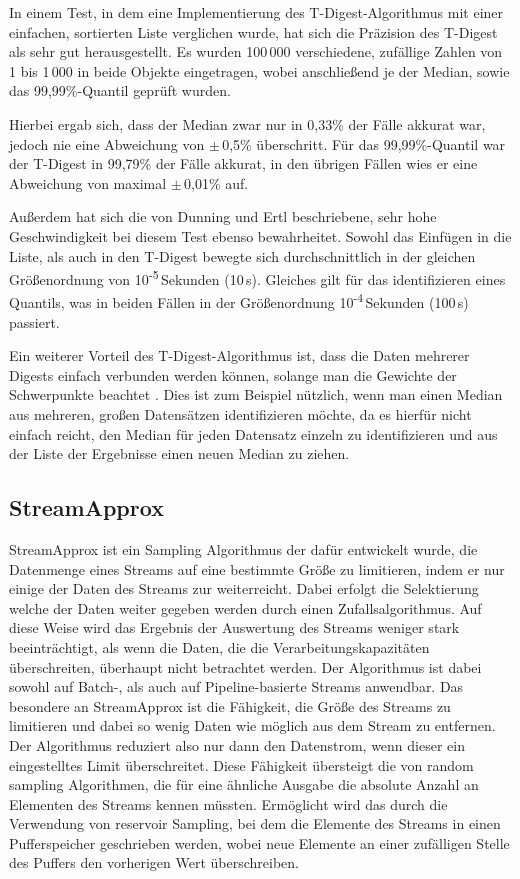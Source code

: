 In einem Test, in dem eine Implementierung des T-Digest-Algorithmus mit einer einfachen, sortierten Liste verglichen wurde, hat sich die Präzision des T-Digest als sehr gut herausgestellt.
Es wurden 100\,000 verschiedene, zufällige Zahlen von 1 bis 1\,000 in beide Objekte eingetragen, wobei anschließend je der Median, sowie das 99,99\%-Quantil geprüft wurden.

Hierbei ergab sich, dass der Median zwar nur in 0,33\% der Fälle akkurat war, jedoch nie eine Abweichung von $\pm$\,0,5\% überschritt.
Für das 99,99\%-Quantil war der T-Digest in 99,79\% der Fälle akkurat, in den übrigen Fällen wies er eine Abweichung von maximal $\pm$\,0,01\% auf.

Außerdem hat sich die von Dunning und Ertl \cite{dunning2019} beschriebene, sehr hohe Geschwindigkeit bei diesem Test ebenso bewahrheitet.
Sowohl das Einfügen in die Liste, als auch in den T-Digest bewegte sich durchschnittlich in der gleichen Größenordnung von 10\textsuperscript{-5}\,Sekunden (10\,\textmu{}s).
Gleiches gilt für das identifizieren eines Quantils, was in beiden Fällen in der Größenordnung 10\textsuperscript{-4}\,Sekunden (100\,\textmu{}s) passiert.

Ein weiterer Vorteil des T-Digest-Algorithmus ist, dass die Daten mehrerer Digests einfach verbunden werden können, solange man die Gewichte der Schwerpunkte beachtet \cite{dunning2019}.
Dies ist zum Beispiel nützlich, wenn man einen Median aus mehreren, großen Datensätzen identifizieren möchte, da es hierfür nicht einfach reicht, den Median für jeden Datensatz einzeln zu identifizieren und aus der Liste der Ergebnisse einen neuen Median zu ziehen.



\subsection{StreamApprox}
StreamApprox ist ein Sampling Algorithmus der dafür entwickelt wurde, 
die Datenmenge eines Streams auf eine bestimmte Größe zu limitieren, 
indem er nur einige der Daten des Streams zur weiterreicht. 
Dabei erfolgt die Selektierung welche der Daten weiter gegeben werden durch einen Zufallsalgorithmus. 
Auf diese Weise wird das Ergebnis der Auswertung des Streams weniger stark beeinträchtigt, 
als wenn die Daten, die die Verarbeitungskapazitäten überschreiten, 
überhaupt nicht betrachtet werden. 
Der Algorithmus ist dabei sowohl auf Batch-, als auch auf Pipeline-basierte Streams anwendbar.
Das besondere an StreamApprox ist die Fähigkeit, 
die Größe des Streams zu limitieren und dabei so wenig Daten wie möglich aus dem Stream zu entfernen. 
Der Algorithmus reduziert also nur dann den Datenstrom, wenn dieser ein eingestelltes Limit überschreitet. 
Diese Fähigkeit übersteigt die von random sampling Algorithmen, 
die für eine ähnliche Ausgabe die absolute Anzahl an Elementen des Streams kennen müssten. 
Ermöglicht wird das durch die Verwendung von reservoir Sampling, 
bei dem die Elemente des Streams in einen Pufferspeicher geschrieben werden, 
wobei neue Elemente an einer zufälligen Stelle des Puffers den vorherigen Wert überschreiben. \cite{quoc2017} 


